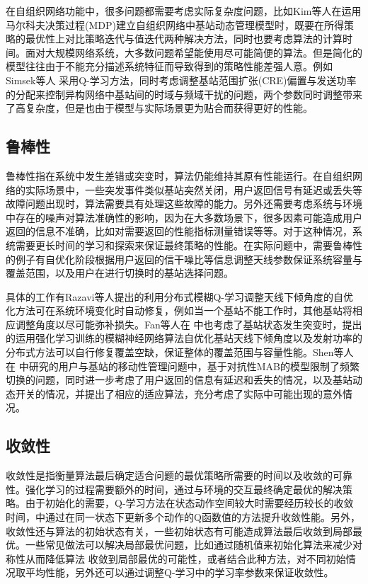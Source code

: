 \documentclass{IEEEtran}
\begin{document}
在自组织网络功能中，很多问题都需要考虑实际复杂度问题，比如Kim等人\cite{Kim2014}在运用马尔科夫决策过程(MDP)建立自组织网络中基站动态管理模型时，既要在所得策略的最优性上对比策略迭代与值迭代两种解决方法，同时也要考虑算法的计算时间。面对大规模网络系统，大多数问题希望能使用尽可能简便的算法。但是简化的模型往往由于不能充分描述系统特征而导致得到的策略性能差强人意。例如Simsek等人\cite{Simsek2015} 采用Q-学习方法，同时考虑调整基站范围扩张(CRE)偏置与发送功率的分配来控制异构网络中基站间的时域与频域干扰的问题，两个参数同时调整带来了高复杂度，但是也由于模型与实际场景更为贴合而获得更好的性能。

\subsection{鲁棒性}
鲁棒性指在系统中发生差错或突变时，算法仍能维持其原有性能运行。在自组织网络的实际场景中，一些突发事件类似基站突然关闭，用户返回信号有延迟或丢失等故障问题出现时，算法需要具有处理这些故障的能力。另外还需要考虑系统与环境中存在的噪声对算法准确性的影响，因为在大多数场景下，很多因素可能造成用户返回的信息不准确，比如对需要返回的性能指标测量错误等等。对于这种情况，系统需要更长时间的学习和探索来保证最终策略的性能。在实际问题中，需要鲁棒性的例子有自优化阶段根据用户返回的信干噪比等信息调整天线参数保证系统容量与覆盖范围，以及用户在进行切换时的基站选择问题。

具体的工作有Razavi等人\cite{Razavi2010}提出的利用分布式模糊Q-学习调整天线下倾角度的自优化方法可在系统环境变化时自动修复，例如当一个基站不能工作时，其他基站将相应调整角度以尽可能弥补损失。Fan等人在\cite{Fan2014} 中也考虑了基站状态发生突变时，提出的运用强化学习训练的模糊神经网络算法自优化基站天线下倾角度以及发射功率的分布式方法可以自行修复覆盖空缺，保证整体的覆盖范围与容量性能。Shen等人在\cite{Shen2016} 中研究的用户与基站的移动性管理问题中，基于对抗性MAB的模型限制了频繁切换的问题，同时进一步考虑了用户返回的信息有延迟和丢失的情况，以及基站动态开关的情况，并提出了相应的适应算法，充分考虑了实际中可能出现的意外情况。

\subsection{收敛性}
收敛性是指衡量算法最后确定适合问题的最优策略所需要的时间以及收敛的可靠性。强化学习的过程需要额外的时间，通过与环境的交互最终确定最优的解决策略。由于初始化的需要，Q-学习方法在状态动作空间较大时需要经历较长的收敛时间，\cite{Simsek2011}中通过在同一状态下更新多个动作的Q函数值的方法提升收敛性能。另外，收敛性还与算法的初始状态有关，一些初始状态有可能造成算法最后收敛到局部最优。一些常见做法可以解决局部最优问题，比如通过随机值来初始化算法来减少对称性从而降低算法 收敛到局部最优的可能性，或者结合此种方法，对不同初始情况取平均性能，另外还可以通过调整Q-学习中的学习率参数来保证收敛性。
\end{document}
